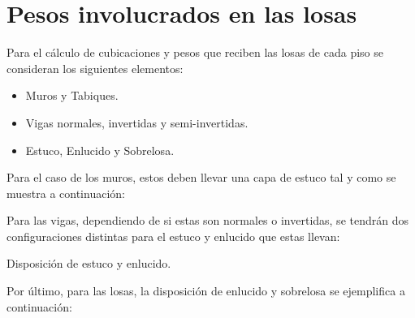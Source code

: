 \documentclass[letterpaper,11pt]{article} %
\begin{document}







\section{Pesos involucrados en las losas}

Para el cálculo de cubicaciones y pesos que reciben las losas de cada piso se consideran los siguientes elementos:
\begin{itemize}
    \item Muros y Tabiques.
    \item Vigas normales, invertidas y semi-invertidas.
    \item Estuco, Enlucido y Sobrelosa.
\end{itemize}

Para el caso de los muros, estos deben llevar una capa de estuco tal y como se muestra a continuación:


Para las vigas, dependiendo de si estas son normales o invertidas, se tendrán dos configuraciones distintas para el estuco y enlucido que estas llevan:

\begin{images}[]{Disposición de estuco y enlucido.}
\end{images}

Por último, para las losas, la disposición de enlucido y sobrelosa se ejemplifica a continuación:

\end{document}
